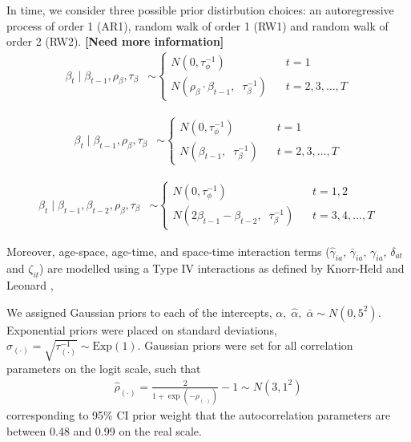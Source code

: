 \documentclass{article}
\begin{document}
\begin{appendix}
In time, we consider three possible prior distirbution choices: an autoregressive process of order 1 (AR1), random walk of order 1 (RW1) and random walk of order 2 (RW2). {\color{red} \bf [Need more information]}
\begin{align*} 
  \beta_t \; | \; \beta_{t-1},  \rho_{\beta}, \tau_{\beta} &\sim
  \begin{cases}
  	N(0, \tau^{-1}_{\phi}) & t = 1\\
  	N(\rho_{\beta} \cdot \beta_{t-1}, \;\; \tau^{-1}_{\beta}) \;\;\; & t = 2, 3,\ldots, T
  \end{cases}
\end{align*}

\begin{align*} 
  \beta_t \; | \; \beta_{t-1}, \rho_{\beta}, \tau_{\beta} &\sim
  \begin{cases}
  	N(0, \tau^{-1}_{\phi}) & t = 1\\
  	N(\beta_{t-1}, \;\; \tau^{-1}_{\beta}) \;\;\; & t = 2, 3,\ldots, T
  \end{cases}
\end{align*}

\begin{align*} 
  \beta_t \; | \; \beta_{t-1}, \beta_{t-2}, \rho_{\beta}, \tau_{\beta} &\sim
  \begin{cases}
  	N(0, \tau^{-1}_{\phi}) & t = 1, 2\\
  	N(2\beta_{t-1} - \beta_{t-2}, \;\; \tau^{-1}_{\beta}) \;\;\; & t = 3, 4,\ldots, T
  \end{cases}
\end{align*}


Moreover, age-space, age-time, and space-time interaction terms ($\hat{\gamma}_{ia}$, $\bar{\gamma}_{ia}$, $\gamma_{ia}$, $\delta_{at}$ and $\zeta_{it}$) are modelled using a Type IV interactions as defined by Knorr-Held and Leonard \cite{knorr2000bayesian},

We assigned Gaussian priors to each of the intercepts, $\alpha, \;\hat{\alpha}, \;\bar{\alpha} \sim N(0, 5^2)$. Exponential priors were placed on standard deviations, $\sigma_{(\cdot)} = \sqrt{\tau^{-1}_{(\cdot)}} \sim \text{Exp}(1)$. Gaussian priors were set for all correlation parameters on the logit scale, such that 
\begin{align*} 
  \hat{\rho}_{(\cdot)} = \frac{2}{1 + \exp(-\rho_{(\cdot)})} - 1 \sim N(3, 1^2)
\end{align*}
corresponding to 95\% CI prior weight that the autocorrelation parameters are between 0.48 and 0.99 on the real scale.


\end{appendix}
\end{document}
